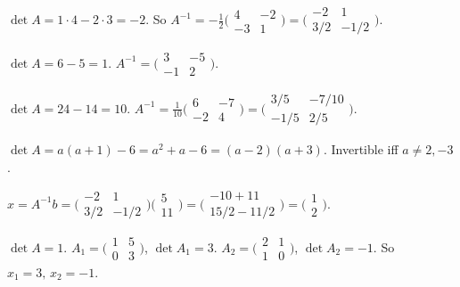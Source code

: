 \begin{solutions}
    \item $\det A = 1 \cdot 4 - 2 \cdot 3 = -2$. So $A^{-1} = -\tfrac{1}{2} \bigl(\begin{smallmatrix} 4 & -2 \\ -3 & 1 \end{smallmatrix}\bigr) = \bigl(\begin{smallmatrix} -2 & 1 \\ 3/2 & -1/2 \end{smallmatrix}\bigr)$.
    \item $\det A = 6 - 5 = 1$. $A^{-1} = \bigl(\begin{smallmatrix} 3 & -5 \\ -1 & 2 \end{smallmatrix}\bigr)$.
    \item $\det A = 24 - 14 = 10$. $A^{-1} = \tfrac{1}{10} \bigl(\begin{smallmatrix} 6 & -7 \\ -2 & 4 \end{smallmatrix}\bigr) = \bigl(\begin{smallmatrix} 3/5 & -7/10 \\ -1/5 & 2/5 \end{smallmatrix}\bigr)$.
    \item $\det A = a(a + 1) - 6 = a^{2} + a - 6 = (a - 2)(a + 3)$. Invertible iff $a \neq 2, -3$.
    \item $x = A^{-1} b = \bigl(\begin{smallmatrix} -2 & 1 \\ 3/2 & -1/2 \end{smallmatrix}\bigr) \bigl(\begin{smallmatrix} 5 \\ 11 \end{smallmatrix}\bigr) = \bigl(\begin{smallmatrix} -10 + 11 \\ 15/2 - 11/2 \end{smallmatrix}\bigr) = \bigl(\begin{smallmatrix} 1 \\ 2 \end{smallmatrix}\bigr)$.
    \item $\det A = 1$. $A_{1} = \bigl(\begin{smallmatrix} 1 & 5 \\ 0 & 3 \end{smallmatrix}\bigr)$, $\det A_{1} = 3$. $A_{2} = \bigl(\begin{smallmatrix} 2 & 1 \\ 1 & 0 \end{smallmatrix}\bigr)$, $\det A_{2} = -1$. So $x_{1} = 3,\, x_{2} = -1$.

\end{solutions}
